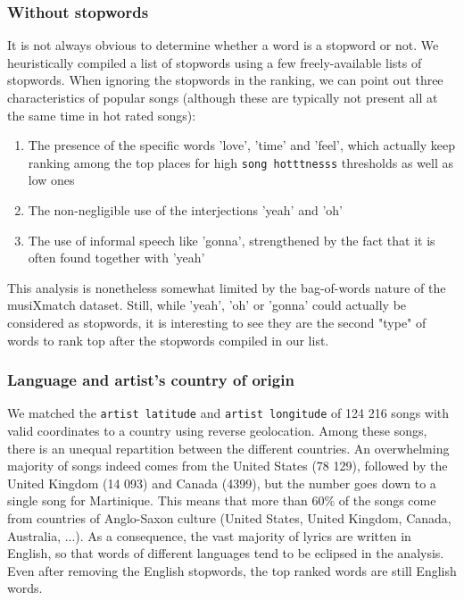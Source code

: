 \documentclass[10pt]{article}
\renewcommand\_{\textunderscore\allowbreak}
\begin{document}
\subsubsection{Without stopwords}
It is not always obvious to determine whether a word is a stopword or not. We heuristically compiled a list of stopwords using a few freely-available lists of stopwords.
When ignoring the stopwords in the ranking, we can point out three characteristics of popular songs (although these are typically not present all at the same time in hot rated songs):
\begin{enumerate}
\itemsep 0mm
\item The presence of the specific words 'love', 'time' and 'feel', which actually keep ranking among the top places for high \texttt{song hotttnesss} thresholds as well as low ones
\item The non-negligible use of the interjections 'yeah' and 'oh' 
\item The use of informal speech like 'gonna', strengthened by the fact that it is often found together with 'yeah'
\end{enumerate}
This analysis is nonetheless somewhat limited by the bag-of-words nature of the musiXmatch dataset. Still, while 'yeah', 'oh' or 'gonna' could actually be considered as stopwords, it is interesting to see they are the second "type" of words to rank top after the stopwords compiled in our list.


\subsubsection{Language and artist's country of origin}
We matched the \texttt{artist latitude} and \texttt{artist longitude} of 124 216 songs with valid coordinates to a country using reverse geolocation.  %
Among these songs, there is an unequal repartition between the different countries.
An overwhelming majority of songs indeed comes from the United States (78 129), followed by the United Kingdom (14 093) and Canada (4399), but the number goes down to a single song for Martinique.
This means that more than 60\% of the songs come from countries of Anglo-Saxon culture (United States, United Kingdom, Canada, Australia, ...). As a consequence, the vast majority of lyrics are written in English, so that words of different languages tend to be eclipsed in the analysis.
Even after removing the English stopwords, the top ranked words are still English words.
\end{document}
